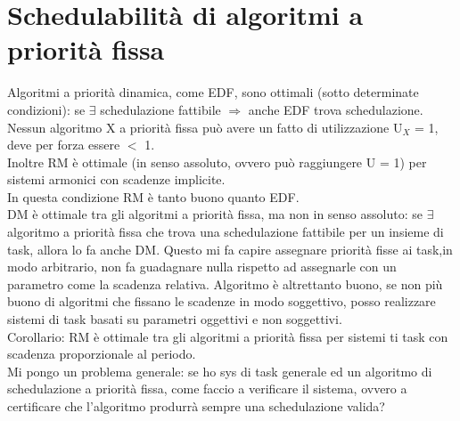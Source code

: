 \documentclass[18px]{article}
\begin{document}
\tableofcontents
\section{Schedulabilità di algoritmi a priorità fissa}
Algoritmi a priorità dinamica, come EDF, sono ottimali (sotto determinate condizioni): se $\exists$ schedulazione fattibile $\Rightarrow$ anche EDF trova schedulazione.\\ Nessun algoritmo X a priorità fissa può avere un fatto di utilizzazione U$_{X}$ = 1, deve per forza essere $<$ 1.\\ Inoltre RM è ottimale (in senso assoluto, ovvero può raggiungere U = 1) per sistemi armonici con scadenze implicite.\\ In questa condizione RM è tanto buono quanto EDF.\\ DM è ottimale tra gli algoritmi a priorità fissa, ma non in senso assoluto: se $\exists$ algoritmo a priorità fissa che trova una schedulazione fattibile per un insieme di task, allora lo fa anche DM. Questo mi fa capire assegnare priorità fisse ai task,in modo arbitrario, non fa guadagnare nulla rispetto ad assegnarle con un parametro come la scadenza relativa. Algoritmo è altrettanto buono, se non più buono di algoritmi che fissano le scadenze in modo soggettivo, posso realizzare sistemi di task basati su parametri oggettivi e non soggettivi.\\ Corollario: RM è ottimale tra gli algoritmi a priorità fissa per sistemi ti task con scadenza proporzionale al periodo.\\ Mi pongo un problema generale: se ho sys di task generale ed un algoritmo di schedulazione a priorità fissa, come faccio a verificare il sistema, ovvero a certificare che l'algoritmo produrrà sempre una schedulazione valida?
\end{document}
